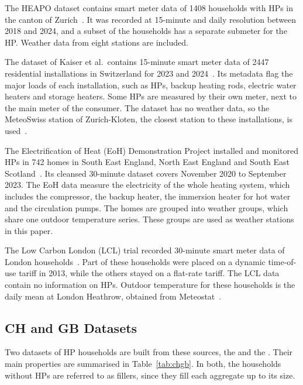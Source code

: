 The HEAPO dataset contains smart meter data of \num{1408} households with HPs in the canton of Zurich~\cite{brudermueller2025heapo}. It was recorded at 15-minute and daily resolution between 2018 and 2024, and a subset of the households has a separate submeter for the HP. Weather data from eight stations are included.

The dataset of Kaiser et al.\ contains 15-minute smart meter data of \num{2447} residential installations in Switzerland for 2023 and 2024~\cite{kaiser2026swiss}. Its metadata flag the major loads of each installation, such as HPs, backup heating rods, electric water heaters and storage heaters. Some HPs are measured by their own meter, next to the main meter of the consumer. The dataset has no weather data, so the MeteoSwiss station of Zurich-Kloten, the closest station to these installations, is used~\cite{kaiser2026swiss}.

The Electrification of Heat (EoH) Demonstration Project installed and monitored HPs in 742 homes in South East England, North East England and South East Scotland~\cite{esc2024eoh}. Its cleansed 30-minute dataset covers November 2020 to September 2023. The EoH data measure the electricity of the whole heating system, which includes the compressor, the backup heater, the immersion heater for hot water and the circulation pumps. The homes are grouped into weather groups, which share one outdoor temperature series. These groups are used as weather stations in this paper.

The Low Carbon London (LCL) trial recorded 30-minute smart meter data of London households~\cite{schofield2015lcl}. Part of these households were placed on a dynamic time-of-use tariff in 2013, while the others stayed on a flat-rate tariff. The LCL data contain no information on HPs. Outdoor temperature for these households is the daily mean at London Heathrow, obtained from Meteostat~\cite{meteostat}.

\subsection{CH and GB Datasets}
\label{sec:chgb}

Two datasets of HP households are built from these sources, the \dataCH{} and the \dataGB. Their main properties are summarised in Table~\ref{tab:chgb}. In both, the households without HPs are referred to as fillers, since they fill each aggregate up to its size.

